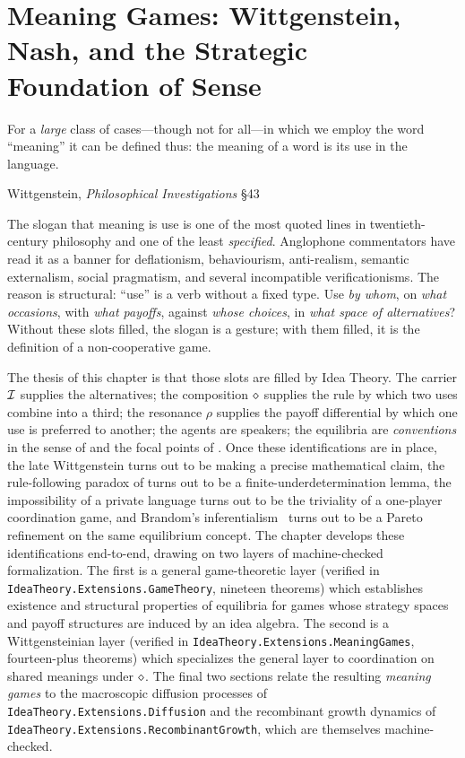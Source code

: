 \chapter{Meaning Games: Wittgenstein, Nash, and the Strategic Foundation of Sense}\label{ch:meaning-games}

\epigraph{For a \emph{large} class of cases---though not for all---in
which we employ the word ``meaning'' it can be defined thus: the meaning
of a word is its use in the language.}{Wittgenstein, \emph{Philosophical
Investigations} \S43~\cite{Wittgenstein1953}}

The slogan that meaning is use is one of the most quoted lines in
twentieth-century philosophy and one of the least
\emph{specified}. Anglophone commentators have read it as a banner for
deflationism, behaviourism, anti-realism, semantic externalism, social
pragmatism, and several incompatible verificationisms. The reason is
structural: ``use'' is a verb without a fixed type. Use \emph{by whom},
on \emph{what occasions}, with \emph{what payoffs}, against \emph{whose
choices}, in \emph{what space of alternatives}? Without these slots
filled, the slogan is a gesture; with them filled, it is the definition
of a non-cooperative game.

The thesis of this chapter is that those slots are filled by Idea
Theory. The carrier $\mathcal{I}$ supplies the alternatives; the composition
$\mathbin{\diamond}$ supplies the rule by which two uses combine into a third; the
resonance $\rho$ supplies the payoff differential by which one use is
preferred to another; the agents are speakers; the equilibria are
\emph{conventions} in the sense of \cite{Lewis1969} and the focal
points of \cite{Schelling1960}. Once these identifications are in place,
the late Wittgenstein turns out to be making a precise mathematical
claim, the rule-following paradox of \cite{Kripke1982} turns out to be a
finite-underdetermination lemma, the impossibility of a private language
turns out to be the triviality of a one-player coordination game, and
Brandom's inferentialism~\cite{Brandom1994} turns out to be a Pareto
refinement on the same equilibrium concept. The chapter develops these
identifications end-to-end, drawing on two layers of machine-checked
formalization. The first is a general game-theoretic layer (verified in
\texttt{IdeaTheory.Extensions.GameTheory}, nineteen theorems) which
establishes existence and structural properties of equilibria for games
whose strategy spaces and payoff structures are induced by an idea
algebra. The second is a Wittgensteinian layer
(verified in \texttt{IdeaTheory.Extensions.MeaningGames},
fourteen-plus theorems) which specializes the general layer to
coordination on shared meanings under $\mathbin{\diamond}$. The final two
sections relate the resulting \emph{meaning games} to the macroscopic
diffusion processes of \texttt{IdeaTheory.Extensions.Diffusion} and the
recombinant growth dynamics of
\texttt{IdeaTheory.Extensions.RecombinantGrowth}, which are themselves
machine-checked.


